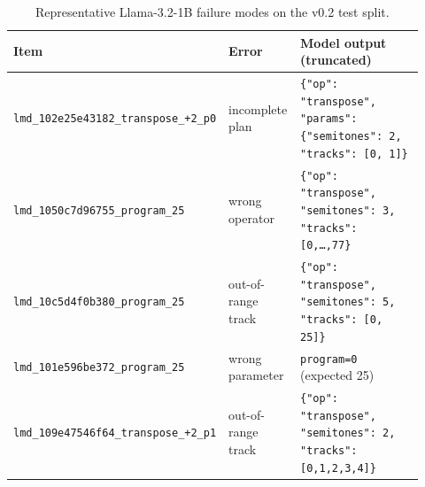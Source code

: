 \begin{table}[t]
\centering
\small
\setlength{\tabcolsep}{3pt}
\begin{tabular}{p{0.22\linewidth}p{0.18\linewidth}p{0.52\linewidth}}
\toprule
Item & Error & Model output (truncated) \\
\midrule
\texttt{lmd\_102e25e43182\_transpose\_+2\_p0} & incomplete plan & \texttt{\{"op": "transpose", "params": \{"semitones": 2, "tracks": [0, 1]\}} \\
\texttt{lmd\_1050c7d96755\_program\_25} & wrong operator & \texttt{\{"op": "transpose", "semitones": 3, "tracks": [0,\ldots,77\}} \\
\texttt{lmd\_10c5d4f0b380\_program\_25} & out-of-range track & \texttt{\{"op": "transpose", "semitones": 5, "tracks": [0, 25]\}} \\
\texttt{lmd\_101e596be372\_program\_25} & wrong parameter & \texttt{program=0} (expected 25) \\
\texttt{lmd\_109e47546f64\_transpose\_+2\_p1} & out-of-range track & \texttt{\{"op": "transpose", "semitones": 2, "tracks": [0,1,2,3,4]\}} \\
\bottomrule
\end{tabular}
\caption{Representative Llama-3.2-1B failure modes on the v0.2 test split.}
\label{tab:failure-examples}
\end{table}
